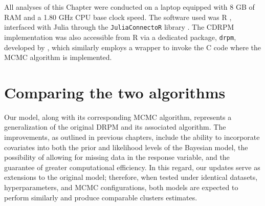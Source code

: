 \documentclass[12pt,	%
	a4paper,		%
	twoside,		%
	openright,		%
	titlepage,%
	]{book}
\theoremstyle{definition}
\let\cite\citep
\begin{document}
All analyses of this Chapter were conducted on a laptop equipped with 8 GB of RAM and a 1.80 GHz CPU base clock speed. The software used was R \cite{R-cite}, interfaced with Julia through the \texttt{JuliaConnectoR} library \cite{juliaconnectoR}.
The CDRPM implementation was also accessible from R via a dedicated package, \texttt{drpm}, developed by \cite{1-drpm}, which similarly employs a wrapper to invoke the C code where the MCMC algorithm is implemented.



\section{Comparing the two algorithms}
\label{Assessing the equivalence of the models}

Our model, along with its corresponding MCMC algorithm, represents a generalization of the original DRPM and its associated algorithm. The improvements, as outlined in previous chapters, include the ability to incorporate covariates into both the prior and likelihood levels of the Bayesian model, the possibility of allowing for missing data in the response variable, and the guarantee of greater computational efficiency. In this regard, our updates serve as extensions to the original model; therefore, when tested under identical datasets, hyperparameters, and MCMC configurations, both models are expected to perform similarly and produce comparable clusters estimates.

\end{document}

